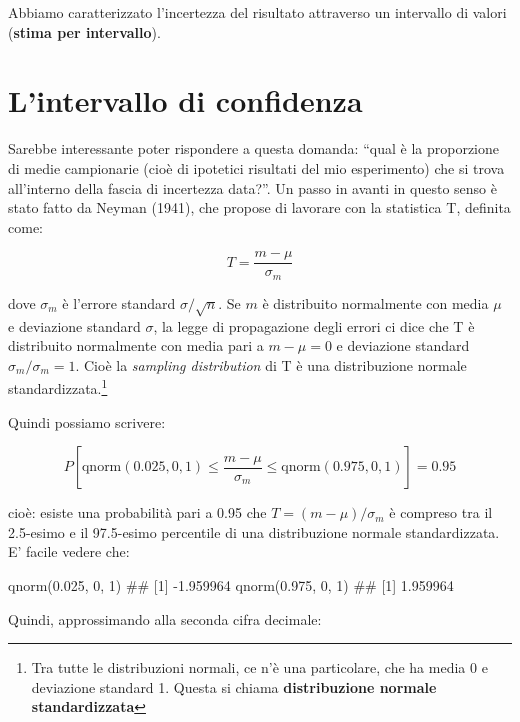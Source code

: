 \documentclass[a4paper,12pt,oneside]{book}
\newenvironment{Shaded}{}{}
\newcommand{\KeywordTok}[1]{#1}
\newcommand{\DecValTok}[1]{#1}
\newcommand{\FloatTok}[1]{#1}
\newcommand{\CommentTok}[1]{#1}
\newcommand{\NormalTok}[1]{#1}
\begin{document}
Abbiamo caratterizzato l'incertezza del risultato attraverso un intervallo di valori (\textbf{stima per intervallo}).

\hypertarget{lintervallo-di-confidenza}{%
\section{L'intervallo di confidenza}\label{lintervallo-di-confidenza}}

Sarebbe interessante poter rispondere a questa domanda: ``qual è la proporzione di medie campionarie (cioè di ipotetici risultati del mio esperimento) che si trova all'interno della fascia di incertezza data?''. Un passo in avanti in questo senso è stato fatto da Neyman (1941), che propose di lavorare con la statistica T, definita come:

\[T = \frac{m - \mu}{\sigma_m}\]

dove \(\sigma_m\) è l'errore standard \(\sigma / \sqrt{n}\). Se \(m\) è distribuito normalmente con media \(\mu\) e deviazione standard \(\sigma\), la legge di propagazione degli errori ci dice che T è distribuito normalmente con media pari a \(m - \mu = 0\) e deviazione standard \(\sigma_m/\sigma_m = 1\). Cioè la \emph{sampling distribution} di T è una distribuzione normale standardizzata.\footnote{Tra tutte le distribuzioni normali, ce n'è una particolare, che ha media 0 e deviazione standard 1. Questa si chiama \textbf{distribuzione normale standardizzata}}

Quindi possiamo scrivere:

\[ P \left[ \textrm{qnorm}(0.025, 0, 1) \le \frac{m - \mu }{\sigma_m} \le \textrm{qnorm}(0.975, 0, 1) \right] = 0.95 \]

cioè: esiste una probabilità pari a 0.95 che \(T = (m - \mu)/\sigma_m\) è compreso tra il 2.5-esimo e il 97.5-esimo percentile di una distribuzione normale standardizzata. E' facile vedere che:

\begin{Shaded}
\begin{Highlighting}[]
\KeywordTok{qnorm}\NormalTok{(}\FloatTok{0.025}\NormalTok{, }\DecValTok{0}\NormalTok{, }\DecValTok{1}\NormalTok{)}
\CommentTok{## [1] -1.959964}
\KeywordTok{qnorm}\NormalTok{(}\FloatTok{0.975}\NormalTok{, }\DecValTok{0}\NormalTok{, }\DecValTok{1}\NormalTok{)}
\CommentTok{## [1] 1.959964}
\end{Highlighting}
\end{Shaded}

Quindi, approssimando alla seconda cifra decimale:
\end{document}
